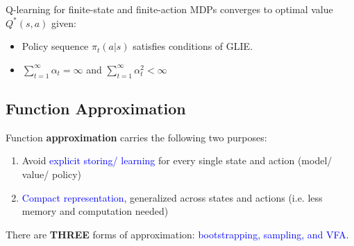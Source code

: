 \documentclass{article}
\begin{document}
Q-learning for finite-state and finite-action MDPs converges to optimal value $Q^{*}(s, a)$ given:
\begin{itemize}
\item Policy sequence $\pi_t(a|s)$ satisfies conditions of GLIE.
\item $\sum_{t = 1}^{\infty} \alpha_t = \infty$ and $\sum_{t = 1}^{\infty} \alpha_t^2 < \infty$
\end{itemize}

\subsection{Function Approximation}
Function \textbf{approximation} carries the following two purposes:
\begin{enumerate}
\item Avoid \textcolor{blue}{explicit storing/ learning} for every single state and action (model/ value/ policy)
\item \textcolor{blue}{Compact representation}, generalized across states and actions (i.e. less memory and computation needed)
\end{enumerate}
There are \textbf{THREE} forms of approximation: \textcolor{blue}{bootstrapping, sampling, and VFA}.
\end{document}
